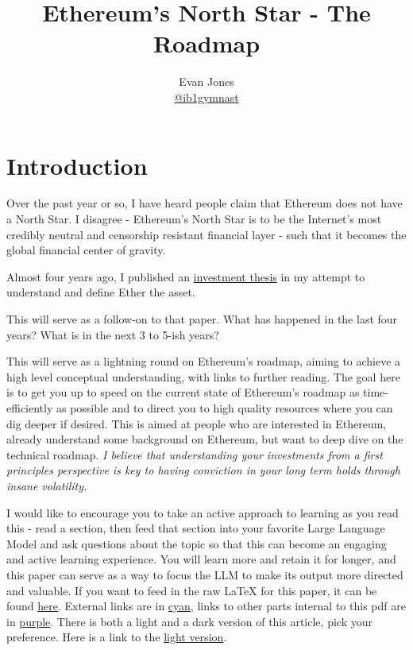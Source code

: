 \documentclass[12pt]{article}
\title{Ethereum's North Star - The Roadmap}
\author{Evan Jones \\ \small \href{https://x.com/ib1gymnast}{@ib1gymnast}}
\begin{document}
\maketitle

\hypersetup{linkcolor=white}
\tableofcontents
\hypersetup{linkcolor=softpurple}  %

\section{Introduction}
\label{Intro}

Over the past year or so, I have heard people claim that Ethereum does not have a North Star. I disagree - Ethereum's North Star is to be the Internet's most credibly neutral and censorship resistant financial layer - such that it becomes the global financial center of gravity.  

Almost four years ago, I published an \href{https://drive.google.com/file/d/1QOn4CBSCqm4lBczFxXCqSBHYueddkAer/view}{investment thesis} in my attempt to understand and define Ether the asset.  

This will serve as a follow-on to that paper. What has happened in the last four years?  What is in the next 3 to 5-ish years?

This will serve as a lightning round on Ethereum's roadmap, aiming to achieve a high level conceptual understanding, with links to further reading. The goal here is to get you up to speed on the current state of Ethereum's roadmap as time-efficiently as possible and to direct you to high quality resources where you can dig deeper if desired. This is aimed at people who are interested in Ethereum, already understand some background on Ethereum, but want to deep dive on the technical roadmap. \textit{I believe that understanding your investments from a first principles perspective is key to having conviction in your long term holds through insane volatility.}

I would like to encourage you to take an active approach to learning as you read this - read a section, then feed that section into your favorite Large Language Model and ask questions about the topic so that this can become an engaging and active learning experience. You will learn more and retain it for longer, and this paper can serve as a way to focus the LLM to make its output more directed and valuable. If you want to feed in the raw LaTeX for this paper, it can be found \href{https://drive.google.com/file/d/1PmTZO5kiDBulgZjDLLtBkzJLPaIL5zzq/view?usp=sharing}{here}. External links are in \href{https://www.google.com/}{cyan}, links to other parts internal to this pdf are in \hyperref[Intro]{purple}. There is both a light and a dark version of this article, pick your preference. Here is a link to the \href{https://drive.google.com/file/d/1xQsr920hG91oHFWmu7kI0iYASWpyCX8a/view?usp=sharing}{light version}. 
\end{document}
